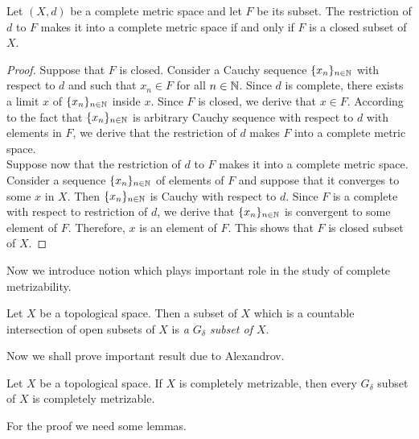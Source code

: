 \begin{proposition}\label{proposition:closed_subsets_are_complete_with_respect_to_metric}
Let $(X,d)$ be a complete metric space and let $F$ be its subset. The restriction of $d$ to $F$ makes it into a complete metric space if and only if $F$ is a closed subset of $X$. 
\end{proposition}
\begin{proof}
Suppose that $F$ is closed. Consider a Cauchy sequence $\{x_n\}_{n\in {\mathbb N}}$ with respect to $d$ and such that $x_n \in F$ for all $n\in {\mathbb N}$. Since $d$ is complete, there exists a limit $x$ of $\{x_n\}_{n\in {\mathbb N}}$ inside $x$. Since $F$ is closed, we derive that $x\in F$. According to the fact that $\{x_n\}_{n\in {\mathbb N}}$ is arbitrary Cauchy sequence with respect to $d$ with elements in $F$, we derive that the restriction of $d$ makes $F$ into a complete metric space.\\
Suppose now that the restriction of $d$ to $F$ makes it into a complete metric space. Consider a sequence $\{x_n\}_{n\in {\mathbb N}}$ of elements of $F$ and suppose that it converges to some $x$ in $X$. Then $\{x_n\}_{n\in {\mathbb N}}$ is Cauchy with respect to $d$. Since $F$ is a complete with respect to restriction of $d$, we derive that $\{x_n\}_{n\in {\mathbb N}}$ is convergent to some element of $F$. Therefore, $x$ is an element of $F$. This shows that $F$ is closed subset of $X$.
\end{proof}
\noindent
Now we introduce notion which plays important role in the study of complete metrizability.

\begin{definition}
Let $X$ be a topological space. Then a subset of $X$ which is a countable intersection of open subsets of $X$ is \textit{a $G_{\delta}$ subset of $X$}.
\end{definition}
\noindent
Now we shall prove important result due to Alexandrov.

\begin{theorem}[Alexandrov]\label{theorem:G_delta_in_completely_metrizable_space_is_completely_metrizable}
Let $X$ be a topological space. If $X$ is completely metrizable, then every $G_{\delta}$ subset of $X$ is completely metrizable. 
\end{theorem}
\noindent
For the proof we need some lemmas.

